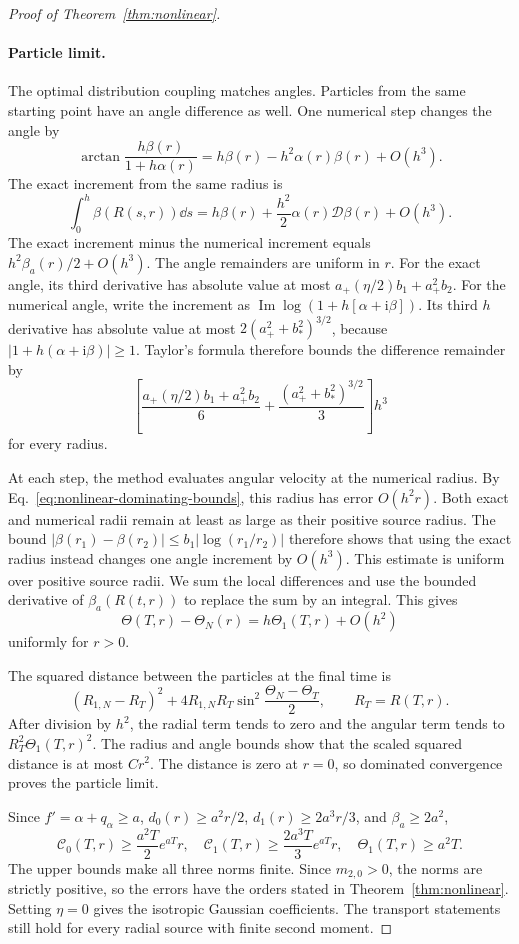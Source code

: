 \begin{proof}[Proof of Theorem~\ref{thm:nonlinear}]
\paragraph{Particle limit.}
The optimal distribution coupling matches angles. Particles from the same starting point have an angle difference as well. One numerical step changes the angle by
\[
 \arctan\frac{h\beta(r)}{1+h\alpha(r)}
 =h\beta(r)-h^2\alpha(r)\beta(r)+O(h^3).
\]
The exact increment from the same radius is
\[
 \int_0^h\beta(R(s,r))\dd s
 =h\beta(r)+\frac{h^2}{2}\alpha(r)\mathcal D \beta(r)+O(h^3).
\]
The exact increment minus the numerical increment equals $h^2\beta_a(r)/2+O(h^3)$. The angle remainders are uniform in $r$. For the exact angle, its third derivative has absolute value at most $a_+(\eta/2)b_1+a_+^2b_2$. For the numerical angle, write the increment as $\operatorname{Im}\log(1+h[\alpha+\mathrm i\beta])$. Its third $h$ derivative has absolute value at most $2(a_+^2+b_*^2)^{3/2}$, because $|1+h(\alpha+\mathrm i\beta)|\ge1$. Taylor's formula therefore bounds the difference remainder by
\[
 \left[\frac{a_+(\eta/2)b_1+a_+^2b_2}{6}
       +\frac{(a_+^2+b_*^2)^{3/2}}{3}\right]h^3
\]
for every radius.

At each step, the method evaluates angular velocity at the numerical radius. By Eq.~\eqref{eq:nonlinear-dominating-bounds}, this radius has error $O(h^2r)$. Both exact and numerical radii remain at least as large as their positive source radius. The bound $|\beta(r_1)-\beta(r_2)|\le b_1|\log(r_1/r_2)|$ therefore shows that using the exact radius instead changes one angle increment by $O(h^3)$. This estimate is uniform over positive source radii. We sum the local differences and use the bounded derivative of $\beta_a(R(t,r))$ to replace the sum by an integral. This gives
\[
 \Theta(T,r)-\Theta_N(r)=h\Theta_1(T,r)+O(h^2)
\]
uniformly for $r>0$.

The squared distance between the particles at the final time is
\[
 (R_{1,N}-R_T)^2+4R_{1,N}R_T\sin^2\frac{\Theta_N-\Theta_T}{2},
 \qquad R_T=R(T,r).
\]
After division by $h^2$, the radial term tends to zero and the angular term tends to $R_T^2\Theta_1(T,r)^2$. The radius and angle bounds show that the scaled squared distance is at most $Cr^2$. The distance is zero at $r=0$, so dominated convergence proves the particle limit.

Since $f'=\alpha+q_\alpha\ge a$, $d_0(r)\ge a^2r/2$, $d_1(r)\ge2a^3r/3$, and $\beta_a\ge2a^2$,
\[
 \mathcal C_0(T,r)\ge\frac{a^2T}{2}e^{aT}r,\quad
 \mathcal C_1(T,r)\ge\frac{2a^3T}{3}e^{aT}r,\quad \Theta_1(T,r)\ge a^2T.
\]
The upper bounds make all three norms finite. Since $m_{2,0}>0$, the norms are strictly positive, so the errors have the orders stated in Theorem~\ref{thm:nonlinear}. Setting $\eta=0$ gives the isotropic Gaussian coefficients. The transport statements still hold for every radial source with finite second moment.
\end{proof}

